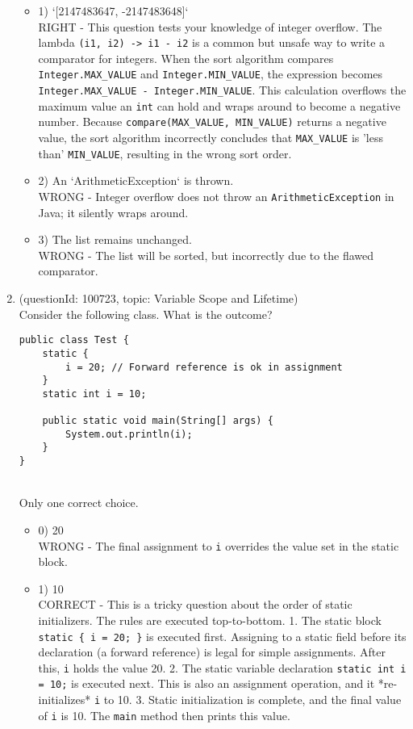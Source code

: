 \documentclass[12pt]{article}
\begin{document}
\begin{enumerate}[label=(\arabic*)]
\begin{itemize}
\item 1) `[2147483647, -2147483648]`
 \\ 
RIGHT - This question tests your knowledge of integer overflow. The lambda \verb|(i1, i2) -> i1 - i2| is a common but unsafe way to write a comparator for integers. When the sort algorithm compares \verb|Integer.MAX_VALUE| and \verb|Integer.MIN_VALUE|, the expression becomes \verb|Integer.MAX_VALUE - Integer.MIN_VALUE|. This calculation overflows the maximum value an \verb|int| can hold and wraps around to become a negative number. Because \verb|compare(MAX_VALUE, MIN_VALUE)| returns a negative value, the sort algorithm incorrectly concludes that \verb|MAX_VALUE| is 'less than' \verb|MIN_VALUE|, resulting in the wrong sort order.

\item 2) An `ArithmeticException` is thrown.
 \\ 
WRONG - Integer overflow does not throw an \verb|ArithmeticException| in Java; it silently wraps around.

\item 3) The list remains unchanged.
 \\ 
WRONG - The list will be sorted, but incorrectly due to the flawed comparator.

\end{itemize}
\item (questionId: 100723, topic: Variable Scope and Lifetime) \\ 
Consider the following class. What is the outcome?\n\begin{verbatim}
public class Test {
    static {
        i = 20; // Forward reference is ok in assignment
    }
    static int i = 10;

    public static void main(String[] args) {
        System.out.println(i);
    }
}
\end{verbatim}
\\ \noindent Only one correct choice. 
\begin{itemize}
\item 0) 20
 \\ 
WRONG - The final assignment to \verb|i| overrides the value set in the static block.

\item 1) 10
 \\ 
CORRECT - This is a tricky question about the order of static initializers. The rules are executed top-to-bottom.
1. The static block \verb|static { i = 20; }| is executed first. Assigning to a static field before its declaration (a forward reference) is legal for simple assignments. After this, \verb|i| holds the value 20.
2. The static variable declaration \verb|static int i = 10;| is executed next. This is also an assignment operation, and it *re-initializes* \verb|i| to 10.
3. Static initialization is complete, and the final value of \verb|i| is 10. The \verb|main| method then prints this value.


\end{itemize}
\end{enumerate}
\end{document}
